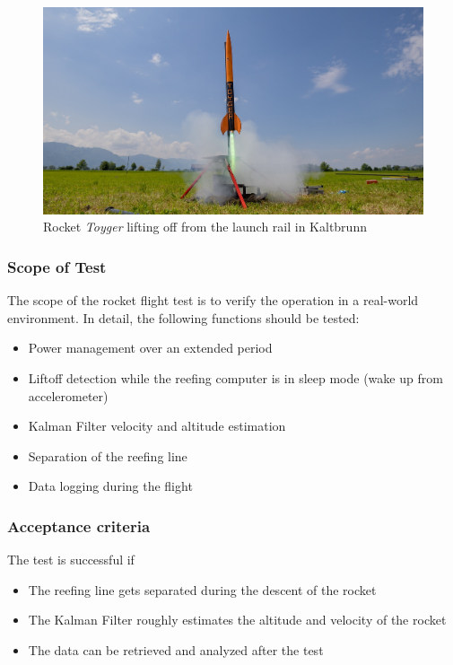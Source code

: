 \begin{figure}[h!]
	\centering
	\includegraphics[width=\textwidth]{images/toyger}
	\caption{Rocket \emph{Toyger} lifting off from the launch rail in Kaltbrunn}
	\label{fig:operation}
\end{figure}

\subsubsection{Scope of Test}
The scope of the rocket flight test is to verify the operation in a real-world environment. In detail, the following functions should be tested:

\begin{itemize}
    \item Power management over an extended period
    \item Liftoff detection while the reefing computer is in sleep mode (wake up from accelerometer)
    \item Kalman Filter velocity and altitude estimation
    \item Separation of the reefing line
    \item Data logging during the flight
\end{itemize}

\subsubsection{Acceptance criteria}
The test is successful if
\begin{itemize}
    \item The reefing line gets separated during the descent of the rocket
    \item The Kalman Filter roughly estimates the altitude and velocity of the rocket
    \item The data can be retrieved and analyzed after the test
\end{itemize}

